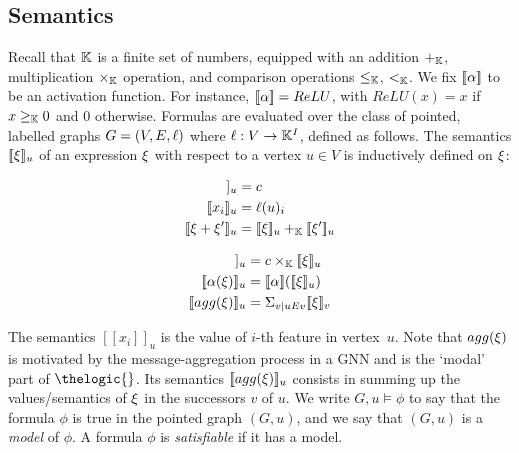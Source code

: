 \subsection{Semantics}

\newcommand{\semone}[1]{[\![#1]\!]}
\newcommand{\sem}[2]{[\![#1]\!]_{#2}}

Recall that $\mathbb K$ is a finite set of numbers, equipped with an addition $+_\mathbb K$, multiplication $\times_\mathbb K$ operation, and comparison operations $\leq_\mathbb K$, $<_\mathbb K$.
We fix $\semone{\activationfunction}$ to be an activation function. For instance, $\semone{\activationfunction} = ReLU$, with $ReLU(x) = x$ if $x \geq_\mathbb K 0$ and $0$ otherwise. 
Formulas are evaluated over the class of pointed, labelled graphs $G = (V, E, \ell)$ where $\ell : V \rightarrow \mathbb K^I$, defined as follows.
The semantics $\sem{\expression} u$ of an expression $\xi$ with respect to a vertex $u\in V$ is inductively defined on $\xi$: 
\begin{center}
\begin{minipage}{40mm}
\begin{align*}
\sem {c} u & = c \\
    \sem {x_i} u & = \ell(u)_i \\
      \sem{\expression + \expression'} u & = \sem \expression u +_{\setnumbers} \sem {\expression'} u 
  \end{align*}
\end{minipage}
\hfill
\begin{minipage}{35mm}
\begin{align*}
  \sem{c \expression} u & = c \times_{\setnumbers} \sem{\expression} u \\
      \sem{\activationfunction (\expression)} u & = \semone{\activationfunction}(\sem \expression u)  \\
    \sem{\agreggationfunction (\expression)} u & = \Sigma_{v \mid u \edges v}\sem {\expression} v
\end{align*}
\end{minipage}
\end{center}

%
The semantics $\sem{x_i}{u}$ is the value of $i$-th feature in vertex~$u$. 
Note that $agg(\xi)$
is motivated by the message-aggregation process in a GNN and is the `modal' part of $\thelogic{}$. Its semantics $\sem{\agreggationfunction(\expression)}{u}$ consists in summing up the values/semantics of $\xi$ in the successors $v$ of $u$.
We write $G, u \models \phi$ to say that the formula $\phi$ is true in the pointed graph $(G,u)$, and we say that $(G,u)$ is a \emph{model} of $\phi$. A formula $\phi$ is \emph{satisfiable} if it has a model. %


